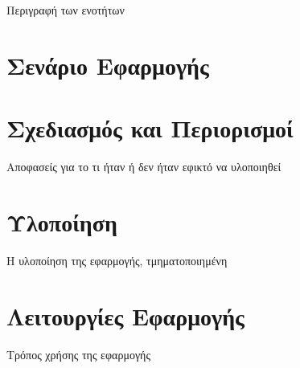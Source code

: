 
Περιγραφή των ενοτήτων

\section{Σενάριο Εφαρμογής}\label{sec:appScenario}


\section{Σχεδιασμός και Περιορισμοί}\label{sec:appDesignAndLimitations}
Αποφασείς για το τι ήταν ή δεν ήταν εφικτό να υλοποιηθεί

\section{Υλοποίηση}\label{sec:appImplementation}
Η υλοποίηση της εφαρμογής, τμηματοποιημένη

\section{Λειτουργίες Εφαρμογής}\label{sec:appFunctionalities}
Τρόπος χρήσης της εφαρμογής

